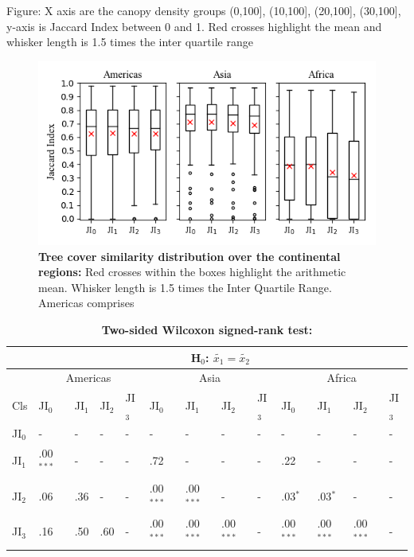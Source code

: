 


			Figure: X axis are the canopy density groups (0,100], (10,100], (20,100], (30,100], y-axis is Jaccard Index between 0 and 1.  Red crosses highlight the mean and whisker length is 1.5 times the inter quartile range
			\begin{figure}[ht]
				\centering
				\includegraphics[scale=1]{img/jaccard}
				\caption[Tree cover similarity distribution of the continental regions]{\textbf{Tree cover similarity distribution over the continental regions:} Red crosses within the boxes highlight the arithmetic mean. Whisker length is 1.5 times the Inter Quartile Range. Americas comprises }
				\label{fig:jaccard}
			\end{figure}
			\begin{table}[ht]
				\centering
				\caption[Two-sided Wilcoxon signed-rank test]{\textbf{Two-sided Wilcoxon signed-rank test:}}
				\label{tab:wilcoxontwosided}
				\begin{tabular}{lllllllllllll}
					\hline
					& \multicolumn{12}{c}{H$_0$: $\tilde{x_1}=\tilde{x_2}$} \\\hline
					& \multicolumn{4}{c}{Americas} & \multicolumn{4}{c}{Asia} & \multicolumn{4}{c}{Africa} \\
					Cls & JI$_0$ & JI$_1$ & JI$_2$ & JI$_3$ & JI$_0$ & JI$_1$ & JI$_2$ & JI$_3$ & JI$_0$ & JI$_1$ & JI$_2$ & JI$_3$ \\\hline
					JI$_0$ & - & - & - & - & - & - & - & - & - & - & - & - \\
					JI$_1$ & .00$^{***}$ & - & - & - & .72 & - & - & - & .22 & - & - & - \\
					JI$_2$ & .06 & .36 & - & - & .00$^{***}$ & .00$^{***}$ & - & - & .03$^{*}$ & .03$^{*}$  & - & - \\
					JI$_3$ & .16 & .50 & .60 & - & .00$^{***}$ & .00$^{***}$ & .00$^{***}$ & - & .00$^{***}$ & .00$^{***}$ & .00$^{***}$ & - \\\hline
				\end{tabular}
			\end{table}
